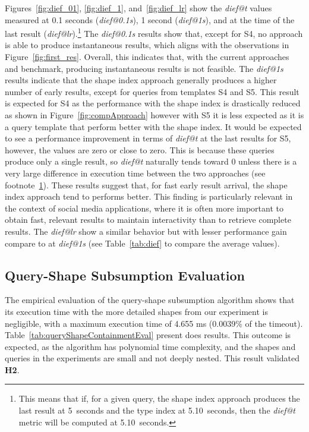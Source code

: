 Figures~\ref{fig:dief_01}, \ref{fig:dief_1}, and~\ref{fig:dief_lr} show the \textit{dief@t} values measured at 0.1 seconds (\textit{dief@0.1s}), 1 second (\textit{dief@1s}), and at the time of the last result (\textit{dief@lr}).\footnote{\label{fn:dief_lt}This means that if, for a given query, the shape index approach produces the last result at 5~seconds and the type index at 5.10~seconds, then the \textit{dief@t} metric will be computed at 5.10~seconds.}  
The \textit{dief@0.1s} results show that, except for S4, no approach is able to produce instantaneous results, which aligns with the observations in Figure~\ref{fig:first_res}.  
Overall, this indicates that, with the current approaches and benchmark, producing instantaneous results is not feasible.
The \textit{dief@1s} results indicate that the shape index approach generally produces a higher number of early results, except for queries from templates S4 and S5.
This result is expected for S4 as the performance with the shape index is drastically reduced as shown in Figure~\ref{fig:compApproach} however with S5 it is less expected as it is a query template that perform better with the shape index.
It would be expected to see a performance improvement in terms of \textit{dief@t} at the last results for S5, however, the values are zero or close to zero.
This is because these queries produce only a single result, so \textit{dief@t} naturally tends toward 0 unless there is a very large difference in execution time between the two approaches (see footnote~\ref{fn:dief_lt}).
These results suggest that, for fast early result arrival, the shape index approach tend to performs better.
This finding is particularly relevant in the context of social media applications, where it is often more important to obtain fast, relevant results to maintain interactivity than to retrieve complete results.  
The \textit{dief@lr} show a similar behavior but with lesser performance gain compare to at \textit{dief@1s} (see Table~\ref{tab:dief} to compare the average values).


\subsection{Query-Shape Subsumption Evaluation} \label{sec:experimentAlgoSubsumption}

The empirical evaluation of the query-shape subsumption algorithm shows that its execution time with the more detailed shapes from our experiment is negligible, with a maximum execution time of 4.655 ms (0.0039\% of the timeout).
Table~\ref{tab:queryShapeContainmentEval} present does results.
This outcome is expected, as the algorithm has polynomial time complexity, and the shapes and queries in the experiments are small and not deeply nested.
This result validated \textbf{H2}.


